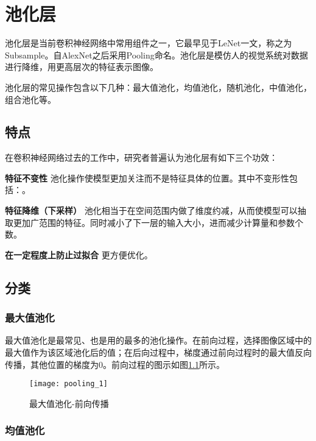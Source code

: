 \chapter{池化层}

池化层是当前卷积神经网络中常用组件之一，它最早见于LeNet一文，称之为Subsample。自AlexNet之后采用Pooling命名。池化层是模仿人的视觉系统对数据进行降维，用更高层次的特征表示图像\cite{RN3}。

池化层的常见操作包含以下几种：最大值池化，均值池化，随机池化，中值池化，组合池化等。

    \section{特点}
    
    在卷积神经网络过去的工作中，研究者普遍认为池化层有如下三个功效\cite{RN4}：
    
    \textbf{特征不变性} \quad 池化操作使模型更加关注而不是特征具体的位置。其中不变形性包括：。
    
    \textbf{特征降维（下采样）} \quad 池化相当于在空间范围内做了维度约减，从而使模型可以抽取更加广范围的特征。同时减小了下一层的输入大小，进而减少计算量和参数个数。
    
    \textbf{在一定程度上防止过拟合} \quad 更方便优化。
    
    
    \section{分类}
    \subsection{最大值池化}
    
    最大值池化是最常见、也是用的最多的池化操作。​在前向过程，选择图像区域中的最大值作为该区域池化后的值；在后向过程中，梯度通过前向过程时的最大值反向传播，其他位置的梯度为0。前向过程的图示如图\ref{fig:11}所示。
    
    \begin{figure}[!htbp]
        \centering
        \texttt{[image: pooling\_1]}
        \caption{最大值池化-前向传播 \cite{RN5}}
        \label{fig:11}
    \end{figure}

    \subsection{均值池化}
    
